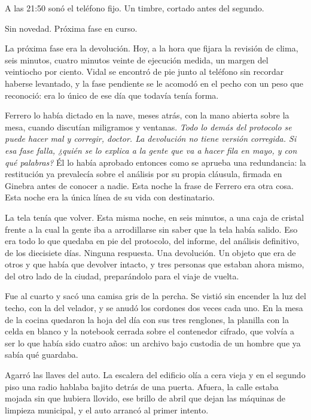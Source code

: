 A las 21:50 sonó el teléfono fijo. Un timbre, cortado antes del segundo.

Sin novedad. Próxima fase en curso.

La próxima fase era la devolución. Hoy, a la hora que fijara la revisión de clima, seis minutos, cuatro minutos veinte de ejecución medida, un margen del veintiocho por ciento. Vidal se encontró de pie junto al teléfono sin recordar haberse levantado, y la fase pendiente se le acomodó en el pecho con un peso que reconoció: era lo único de ese día que todavía tenía forma.

Ferrero lo había dictado en la nave, meses atrás, con la mano abierta sobre la mesa, cuando discutían miligramos y ventanas. \textit{Todo lo demás del protocolo se puede hacer mal y corregir, doctor. La devolución no tiene versión corregida. Si esa fase falla, ¿quién se lo explica a la gente que va a hacer fila en mayo, y con qué palabras?} Él lo había aprobado entonces como se aprueba una redundancia: la restitución ya prevalecía sobre el análisis por su propia cláusula, firmada en Ginebra antes de conocer a nadie. Esta noche la frase de Ferrero era otra cosa. Esta noche era la única línea de su vida con destinatario.

La tela tenía que volver. Esta misma noche, en seis minutos, a una caja de cristal frente a la cual la gente iba a arrodillarse sin saber que la tela había salido. Eso era todo lo que quedaba en pie del protocolo, del informe, del análisis definitivo, de los diecisiete días. Ninguna respuesta. Una devolución. Un objeto que era de otros y que había que devolver intacto, y tres personas que estaban ahora mismo, del otro lado de la ciudad, preparándolo para el viaje de vuelta.

Fue al cuarto y sacó una camisa gris de la percha. Se vistió sin encender la luz del techo, con la del velador, y se anudó los cordones dos veces cada uno. En la mesa de la cocina quedaron la hoja del día con sus tres renglones, la planilla con la celda en blanco y la notebook cerrada sobre el contenedor cifrado, que volvía a ser lo que había sido cuatro años: un archivo bajo custodia de un hombre que ya sabía qué guardaba.

Agarró las llaves del auto. La escalera del edificio olía a cera vieja y en el segundo piso una radio hablaba bajito detrás de una puerta. Afuera, la calle estaba mojada sin que hubiera llovido, ese brillo de abril que dejan las máquinas de limpieza municipal, y el auto arrancó al primer intento.

